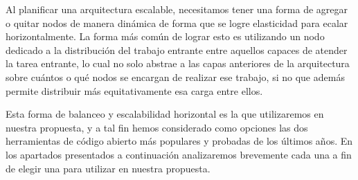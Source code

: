 Al planificar una arquitectura escalable, necesitamos tener una forma de agregar o quitar nodos de manera dinámica de forma que se logre elasticidad para ecalar horizontalmente. La forma más común de lograr esto es utilizando un nodo dedicado a la distribución del trabajo entrante entre aquellos capaces de atender la tarea entrante, lo cual no solo abstrae a las capas anteriores de la arquitectura sobre cuántos o qué nodos se encargan de realizar ese trabajo, si no que además permite distribuir más equitativamente esa carga entre ellos.

Esta forma de balanceo y escalabilidad horizontal es la que utilizaremos en nuestra propuesta, y a tal fin hemos considerado como opciones las dos herramientas de código abierto más populares y probadas de los últimos años. En los apartados presentados a continuación analizaremos brevemente cada una a fin de elegir una para utilizar en nuestra propuesta.
